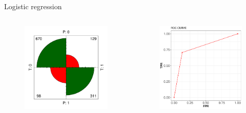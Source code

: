 \documentclass{beamer}
\begin{document}
\begin{frame}{Logistic regression}
\begin{columns}
  \begin{figure}[b]{\textwidth}
    \includegraphics[width=\textwidth]{Pic/Logisic_confusion.pdf}
  \end{figure} 
  \begin{figure}[b]{\textwidth}
    \includegraphics[width=\textwidth]{Pic/ROC_Logistic.pdf}
  \end{figure}
\end{columns}
\end{frame}
\end{document}
